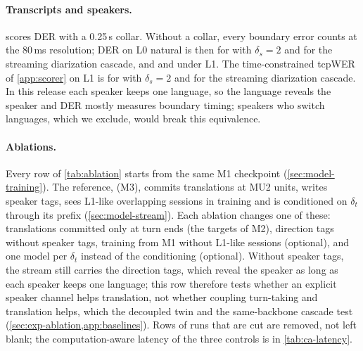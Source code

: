 

\paragraph{Transcripts and speakers.}
 scores DER with a 0.25\,s collar. Without a collar, every boundary error counts at the 80\,ms resolution; DER on \taxi L0 natural is then \tbdtext{} for \model with $\delta_s=2$ and \tbdtext{} for the streaming diarization cascade, and \tbdtext{} and \tbdtext{} under L1. The time-constrained tcpWER of \cref{app:scorer} on \taxi L1 is \tbdtext{} for \model with $\delta_s=2$ and \tbdtext{} for the streaming diarization cascade. In this release each speaker keeps one language, so the language reveals the speaker and DER mostly measures boundary timing; speakers who switch languages, which we exclude, would break this equivalence.

\paragraph{Ablations.}
Every row of \cref{tab:ablation} starts from the same M1 checkpoint (\cref{sec:model-training}). The reference, \model (M3), commits translations at MU2 units, writes speaker tags, sees L1-like overlapping sessions in training and is conditioned on $\delta_t$ through its prefix (\cref{sec:model-stream}). Each ablation changes one of these: translations committed only at turn ends (the targets of M2), direction tags without speaker tags, training from M1 without L1-like sessions (optional), and one model per $\delta_t$ instead of the conditioning (optional). Without speaker tags, the stream still carries the direction tags, which reveal the speaker as long as each speaker keeps one language; this row therefore tests whether an explicit speaker channel helps translation, not whether coupling turn-taking and translation helps, which the decoupled twin and the same-backbone cascade test (\cref{sec:exp-ablation,app:baselines}). Rows of runs that are cut are removed, not left blank; the computation-aware latency of the three controls is in \cref{tab:ca-latency}.

\clearpage
